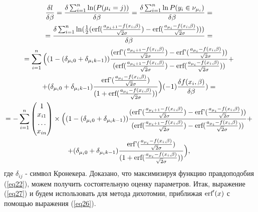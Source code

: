 \documentclass[a4paper,14pt]{extarticle}
\begin{document}
\begin{multline}
    \label{eq27}\frac{\delta l}{\delta \beta}=\frac{\delta \sum_{i=1}^{n}\ln(P(\mu_i=j))}{\delta \beta}=\frac{\delta \sum_{i=1}^{n}\ln P(y_i\in \nu_{\mu_i})}{\delta \beta}=~\\
    =\frac{\delta \sum_{i=1}^{n} \ln(\frac{1}{2}(\textup{erf}(\frac{a_{\mu_i+1}-f(x_i,\beta)}{\sqrt{2}\sigma})-\textup{erf}(\frac{a_{\mu_i}-f(x_i,\beta)}{\sqrt{2}\sigma})) )         }{\delta \beta}=~\\
    =  \sum_{i=1}^{n}\Big((1-(\delta_{\mu_i 0}+\delta_{\mu_i k-1}))\frac{(\textup{erf'}(\frac{a_{\mu_i+1}-f(x_i,\beta)}{\sqrt{2}\sigma})-\textup{erf'}(\frac{a_{\mu_i}-f(x_i,\beta)}{\sqrt{2}\sigma}))}{ (\textup{erf}(\frac{a_{\mu_i+1}-f(x_i,\beta)}{\sqrt{2}\sigma})-\textup{erf}(\frac{a_{\mu_i}-f(x_i,\beta)}{\sqrt{2}\sigma}))}+~\\
    +(\delta_{\mu_i 0}+\delta_{\mu_i k-1})\frac{\textup{erf'}(\frac{a_{\mu_i}-f(x_i,\beta)}{\sqrt{2}\sigma})}{(1+\textup{erf}(\frac{a_{\mu_i}-f(x_i,\beta)}{\sqrt{2}\sigma}))}\Big)  (-1) \frac{\delta f(x_i,\beta)}{\delta \beta} )=~\\
    =-\sum_{i=1}^{n}\begin{pmatrix}
        1\\
        x_{i1}\\
        \dots\\
        x_{in}
    \end{pmatrix}\times  \Big((1-(\delta_{\mu_i 0}+\delta_{\mu_i k-1}))\frac{(\textup{erf'}(\frac{a_{\mu_i+1}-f(x_i,\beta)}{\sqrt{2}\sigma})-\textup{erf'}(\frac{a_{\mu_i}-f(x_i,\beta)}{\sqrt{2}\sigma}))}{ (\textup{erf}(\frac{a_{\mu_i+1}-f(x_i,\beta)}{\sqrt{2}\sigma})-\textup{erf}(\frac{a_{\mu_i}-f(x_i,\beta)}{\sqrt{2}\sigma}))}+~\\
    +(\delta_{\mu_i 0}+\delta_{\mu_i k-1})\frac{\textup{erf'}(\frac{a_{\mu_i}-f(x_i,\beta)}{\sqrt{2}\sigma})}{(1+\textup{erf}(\frac{a_{\mu_i}-f(x_i,\beta)}{\sqrt{2}\sigma}))}\Big)  ,~
\end{multline}
где $\delta_{ij}$ - символ Кронекера.\hfill\break
Доказано, что максимизируя функцию правдоподобия (\ref{eq22}), можем получить состоятельную оценку\cite{OLSforGrouping} параметров. \hfill\break
Итак, выражение (\ref{eq27}) и будем использовать для метода дихотомии, приближая $\textup{erf}'(x)$ с помощью выражения (\ref{eq26}).
\end{document}
